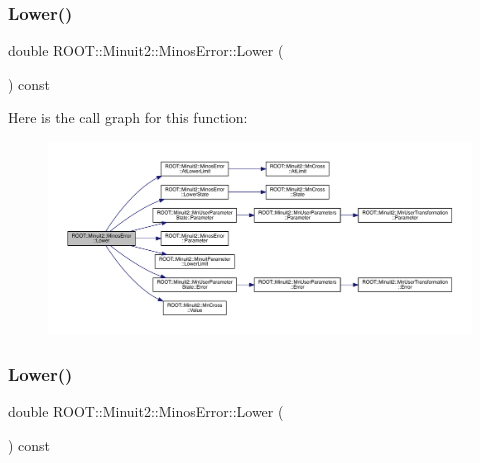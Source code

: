 \subsubsection{\texorpdfstring{Lower()}{Lower()}\hspace{0.1cm}{\footnotesize\ttfamily [1/3]}}
{\footnotesize\ttfamily double R\+O\+O\+T\+::\+Minuit2\+::\+Minos\+Error\+::\+Lower (\begin{DoxyParamCaption}{ }\end{DoxyParamCaption}) const\hspace{0.3cm}{\ttfamily [inline]}}

Here is the call graph for this function\+:
\nopagebreak
\begin{figure}[H]
\begin{center}
\leavevmode
\includegraphics[width=350pt]{d2/dd1/classROOT_1_1Minuit2_1_1MinosError_ac412aab9b0a59a427fbe7e3cfad47f0c_cgraph}
\end{center}
\end{figure}
\mbox{\label{classROOT_1_1Minuit2_1_1MinosError_ac412aab9b0a59a427fbe7e3cfad47f0c}} 
\subsubsection{\texorpdfstring{Lower()}{Lower()}\hspace{0.1cm}{\footnotesize\ttfamily [2/3]}}
{\footnotesize\ttfamily double R\+O\+O\+T\+::\+Minuit2\+::\+Minos\+Error\+::\+Lower (\begin{DoxyParamCaption}{ }\end{DoxyParamCaption}) const\hspace{0.3cm}{\ttfamily [inline]}}

